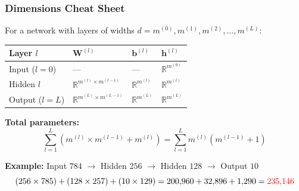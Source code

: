 \documentclass[notes,11pt, aspectratio=169]{beamer}
\newcommand{\vb}{\mathbf{b}}
\newcommand{\vh}{\mathbf{h}}
\newcommand{\vW}{\mathbf{W}}
\newcommand{\R}{\mathbb{R}}
\begin{document}
\begin{frame}
\frametitle{Dimensions Cheat Sheet}

For a network with layers of widths $d = m^{(0)}, m^{(1)}, m^{(2)}, \ldots, m^{(L)}$:

\vspace{8pt}
\begin{center}
\renewcommand{\arraystretch}{1.5}
\begin{tabular}{llll}
    \toprule
    \textbf{Layer $l$} & \textbf{$\vW^{(l)}$} & \textbf{$\vb^{(l)}$} & \textbf{$\vh^{(l)}$} \\
    \midrule
    Input ($l=0$) & --- & --- & $\R^{m^{(0)}}$ \\
    Hidden $l$ & $\R^{m^{(l)} \times m^{(l-1)}}$ & $\R^{m^{(l)}}$ & $\R^{m^{(l)}}$ \\
    Output ($l=L$) & $\R^{m^{(L)} \times m^{(L-1)}}$ & $\R^{m^{(L)}}$ & $\R^{m^{(L)}}$ \\
    \bottomrule
\end{tabular}
\end{center}

\vspace{8pt}
\textbf{Total parameters:}
\[
    \sum_{l=1}^{L} \left( m^{(l)} \times m^{(l-1)} + m^{(l)} \right) = \sum_{l=1}^{L} m^{(l)}\left(m^{(l-1)} + 1\right)
\]

\vspace{4pt}
\textbf{Example:} Input $784$ $\to$ Hidden $256$ $\to$ Hidden $128$ $\to$ Output $10$
\[
    (256 \times 785) + (128 \times 257) + (10 \times 129) = 200{,}960 + 32{,}896 + 1{,}290 = \textcolor{red}{235{,}146}
\]
\end{frame}
\end{document}
